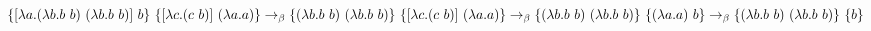 \documentclass[12pt]{article}
\begin{document}
\large

\noindent
$
\{[\lambda a.(\lambda b.b\ b)\ (\lambda b.b\ b)]\ b\}\ \{[\lambda c.(c\ b)]\ (\lambda a.a)\} \rightarrow_\beta \\
\{(\lambda b.b\ b)\ (\lambda b.b\ b)\}\ \{[\lambda c.(c\ b)]\ (\lambda a.a)\} \rightarrow_\beta \\
\{(\lambda b.b\ b)\ (\lambda b.b\ b)\}\ \{(\lambda a.a)\ b\} \rightarrow_\beta \\
\{(\lambda b.b\ b)\ (\lambda b.b\ b)\}\ \{b\}
$
\end{document}
